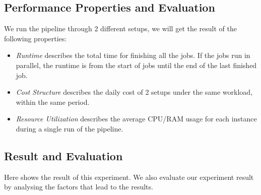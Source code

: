 \subsection{Performance Properties and Evaluation}
We run the pipeline through 2 different setups, we will get the result of the following properties:
\begin{itemize}
\item \textit{Runtime} describes the total time for finishing all the jobs. If the jobs run in parallel, the runtime is from the start of jobs until the end of the last finished job.
\item \textit{Cost Structure} describes the daily cost of 2 setups under the same workload, within the same period.
\item \textit{Resource Utilization} describes the average CPU/RAM usage for each instance during a single run of the pipeline.
\end{itemize}
\subsection{Result and Evaluation}
Here shows the result of this experiment. We also evaluate our experiment result by analysing the factors that lead to the results.
